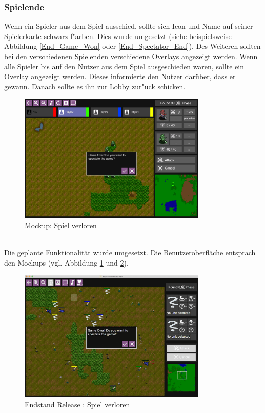 \documentclass[12pt, titlepage]{scrartcl}
\newcommand{\RN}[1]{%
	\textup{\uppercase\expandafter{\romannumeral#1}}%
}
\newcounter{subsubsubsection}[subsubsection]
\begin{document}
			\subsubsection{Spielende}
				Wenn ein Spieler aus dem Spiel ausschied, sollte sich Icon und Name auf seiner Spielerkarte schwarz f"arben. Dies wurde umgesetzt (siehe beispielsweise Abbildung \ref{End_Game_Won} oder \ref{End_Spectator_End}). Des Weiteren sollten bei den verschiedenen Spielenden verschiedene Overlays angezeigt werden.
					Wenn alle Spieler bis auf den Nutzer aus dem Spiel ausgeschieden waren, sollte ein Overlay angezeigt werden. Dieses informierte den Nutzer dar\"uber, dass er gewann. Danach sollte es ihn zur Lobby zur"uck schicken.
					\begin{figure}[H] 
						\centering
						\includegraphics[width=0.8\textwidth]{images/mockups/GameOver.png}
						\caption{Mockup: Spiel verloren}
						\label{Game_Lost_2}
					\end{figure}
					\ \\ Die geplante Funktionalit\"at wurde umgesetzt. Die Benutzeroberfl\"ache entsprach den Mockups (vgl. Abbildung \ref{Game_Lost_2} und \ref{End_Game_Lost}).
					\begin{figure}[H] 
						\centering
						\includegraphics[width=0.8\textwidth]{images/endOfRelease/GameOver.png}
						\caption{Endstand Release \RN{3}: Spiel verloren}
						\label{End_Game_Lost}
					\end{figure}
\end{document}
